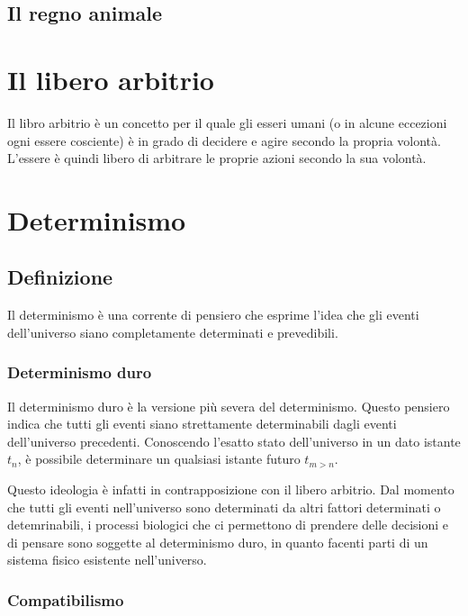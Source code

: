 \documentclass{article}
\begin{document}
\subsection{Il regno animale}

\section{Il libero arbitrio}

Il libro arbitrio è un concetto per il quale gli esseri umani
(o in alcune eccezioni ogni essere cosciente) è in grado di decidere e agire secondo la propria volontà.
L'essere è quindi libero di arbitrare le proprie azioni secondo la sua volontà.

\section{Determinismo}

\subsection{Definizione}

Il determinismo è una corrente di pensiero che esprime l'idea
che gli eventi dell'universo siano completamente determinati e prevedibili.

\subsubsection{Determinismo duro}

Il determinismo duro è la versione più severa del determinismo.
Questo pensiero indica che tutti gli eventi siano strettamente
determinabili dagli eventi dell'universo precedenti.
Conoscendo l'esatto stato dell'universo in un dato istante \(t_n\), è possibile
determinare un qualsiasi istante futuro \(t_{m > n}\).

Questo ideologia è infatti in contrapposizione con il libero arbitrio.
Dal momento che tutti gli eventi nell'universo sono determinati da altri fattori determinati
o detemrinabili, i processi biologici che ci permettono di prendere delle decisioni e di pensare
sono soggette al determinismo duro, in quanto facenti parti di un sistema fisico esistente nell'universo.

\subsubsection{Compatibilismo}
\end{document}
